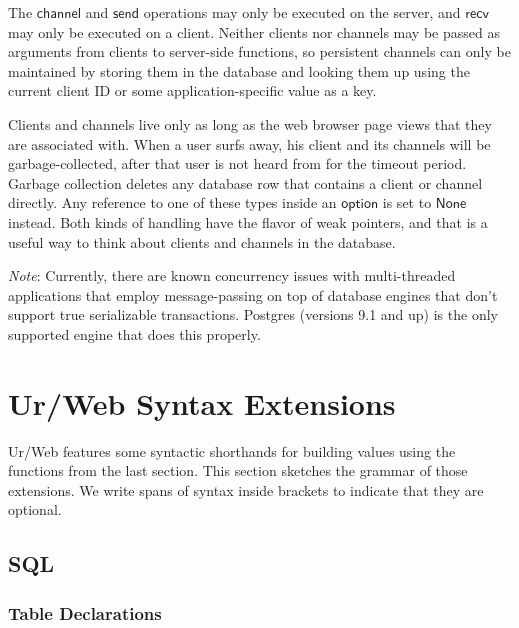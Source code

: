 \documentclass{article}
\newcommand{\mt}[1]{\mathsf{#1}}
\begin{document}
The $\mt{channel}$ and $\mt{send}$ operations may only be executed on the server, and $\mt{recv}$ may only be executed on a client.  Neither clients nor channels may be passed as arguments from clients to server-side functions, so persistent channels can only be maintained by storing them in the database and looking them up using the current client ID or some application-specific value as a key.

Clients and channels live only as long as the web browser page views that they are associated with.  When a user surfs away, his client and its channels will be garbage-collected, after that user is not heard from for the timeout period.  Garbage collection deletes any database row that contains a client or channel directly.  Any reference to one of these types inside an $\mt{option}$ is set to $\mt{None}$ instead.  Both kinds of handling have the flavor of weak pointers, and that is a useful way to think about clients and channels in the database.

\emph{Note}: Currently, there are known concurrency issues with multi-threaded applications that employ message-passing on top of database engines that don't support true serializable transactions.  Postgres (versions 9.1 and up) is the only supported engine that does this properly.


\section{Ur/Web Syntax Extensions}

Ur/Web features some syntactic shorthands for building values using the functions from the last section.  This section sketches the grammar of those extensions.  We write spans of syntax inside brackets to indicate that they are optional.

\subsection{SQL}

\subsubsection{\label{tables}Table Declarations}
\end{document}
